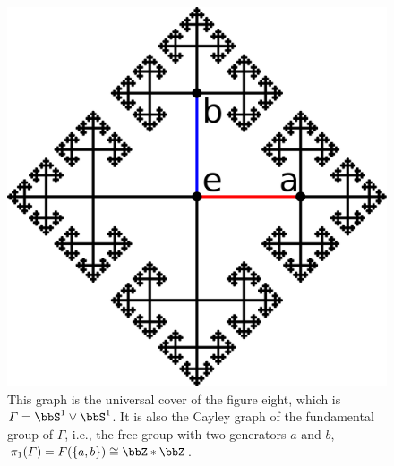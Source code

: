 \begin{figure}[tp]
    \centering
        \includegraphics[scale=0.15]{figures/Cayley.pdf}
    \caption{This graph is the universal cover of the figure eight, which is $\varGamma=\bbS^1 \vee \bbS^1$. It is also the Cayley graph of the fundamental group of $\varGamma$, i.e., the free group with two generators $a$ and $b$, $\pi_1(\varGamma)=F(\{a,b\})\cong\bbZ\ast\bbZ$. \label{Fig. Cayley}}
\end{figure}

